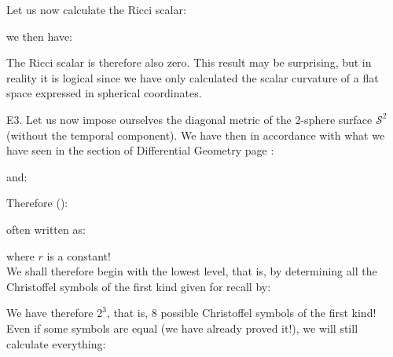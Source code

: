 	\begin{tcolorbox}[colframe=black,colback=white,sharp corners]
	
	\end{tcolorbox}
	
	\begin{tcolorbox}[colframe=black,colback=white,sharp corners]
	
	\end{tcolorbox}
	
	\begin{tcolorbox}[colframe=black,colback=white,sharp corners]
	
	\end{tcolorbox}
	
	\begin{tcolorbox}[colframe=black,colback=white,sharp corners]
	
	Let us now calculate the Ricci scalar:
	
	we then have:
	
	The Ricci scalar is therefore also zero. This result may be surprising, but in reality it is logical since we have only calculated the scalar curvature of a flat space expressed in spherical coordinates.
	\end{tcolorbox}
	
	\begin{tcolorbox}[colframe=black,colback=white,sharp corners]
	E3. Let us now impose ourselves the diagonal metric of the 2-sphere surface $\mathcal{S}^2$ (without the temporal component). We have then in accordance with what we have seen in the section of Differential Geometry page \pageref{metric two sphere}:
	
	and:
	
	Therefore ():
	
	often written as:
	
	where $r$ is a constant!\\

	We shall therefore begin with the lowest level, that is, by determining all the Christoffel symbols of the first kind given for recall by:
	
	We have therefore $2^3$, that is, $8$ possible Christoffel symbols of the first kind! Even if some symbols are equal (we have already proved it!), we will still calculate everything:
	
	\end{tcolorbox}
	
